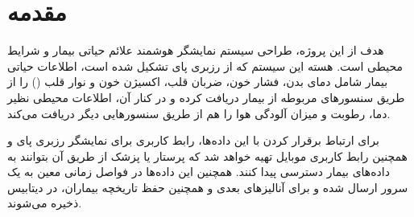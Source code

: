 \documentclass[12pt]{article}
\begin{document}
\newpage
\pagestyle{fancy}
\fancyhf{}
\fancyfoot{}
\cfoot{\thepage}
\chead{}

\newfontfamily{}

\KashidaOff
 \newcommand{\inlineLatin}[1]{
	\small{\lr{{\terminal #1}}}
}


\tableofcontents
\listoffigures
\listoftables

\section{مقدمه}


هدف از این پروژه، طراحی سیستم نمایشگر هوشمند علائم حیاتی بیمار و شرایط محیطی است. هسته این سیستم که از رزبری پای تشکیل شده است، اطلاعات حیاتی بیمار شامل دمای بدن، فشار خون، ضربان قلب، اکسیژن خون و نوار قلب () را از طریق سنسور‌های مربوطه از بیمار دریافت کرده و در کنار آن، اطلاعات محیطی نظیر دما،‌ رطوبت و میزان آلودگی هوا را هم از طریق سنسورهایی دیگر دریافت می‌کند.

برای ارتباط برقرار کردن با این داده‌ها، رابط کاربری برای نمایشگر رزبری پای و همچنین رابط کاربری موبایل تهیه خواهد شد که پرستار یا پزشک از طریق آن بتوانند به داده‌های بیمار دسترسی پیدا کنند. همچنین این داده‌ها در فواصل زمانی معین به یک سرور ارسال شده و برای آنالیزهای بعدی و همچنین حفظ تاریخچه بیماران، در دیتابیس ذخیره می‌شوند.
\end{document}
